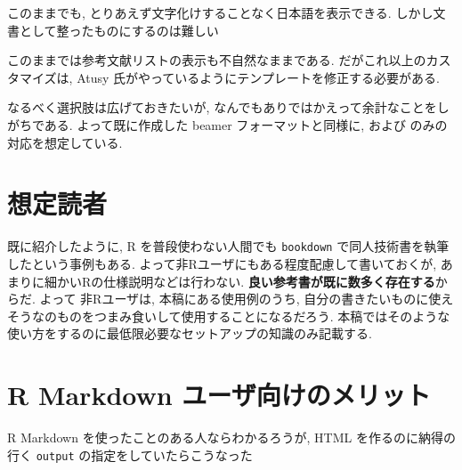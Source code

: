 \documentclass[
  nomag]{bxjsbook}
\theoremstyle{definition}
\theoremstyle{definition}
\theoremstyle{definition}
\theoremstyle{remark}
\begin{document}
このままでも, とりあえず文字化けすることなく日本語を表示できる.
しかし文書として整ったものにするのは難しい

このままでは参考文献リストの表示も不自然なままである.
だがこれ以上のカスタマイズは, Atusy
氏がやっているようにテンプレートを修正する必要がある.

なるべく選択肢は広げておきたいが,
なんでもありではかえって余計なことをしがちである. よって既に作成した
beamer フォーマットと同様に, \XeLaTeX および \LuaLaTeX
のみの対応を想定している.

\hypertarget{ux60f3ux5b9aux8aadux8005}{%
\section*{想定読者}\label{ux60f3ux5b9aux8aadux8005}}

既に紹介したように, R を普段使わない人間でも \texttt{bookdown}
で同人技術書を執筆したという事例もある.
よって非Rユーザにもある程度配慮して書いておくが,
あまりに細かいRの仕様説明などは行わない.
\textbf{良い参考書が既に数多く存在する}からだ. よって 非Rユーザは,
本稿にある使用例のうち,
自分の書きたいものに使えそうなのものをつまみ食いして使用することになるだろう.
本稿ではそのような使い方をするのに最低限必要なセットアップの知識のみ記載する.

\hypertarget{r-markdown-ux30e6ux30fcux30b6ux5411ux3051ux306eux30e1ux30eaux30c3ux30c8}{%
\section*{R Markdown
ユーザ向けのメリット}\label{r-markdown-ux30e6ux30fcux30b6ux5411ux3051ux306eux30e1ux30eaux30c3ux30c8}}

R Markdown を使ったことのある人ならわかるろうが, HTML
を作るのに納得の行く \texttt{output} の指定をしていたらこうなった
\end{document}
